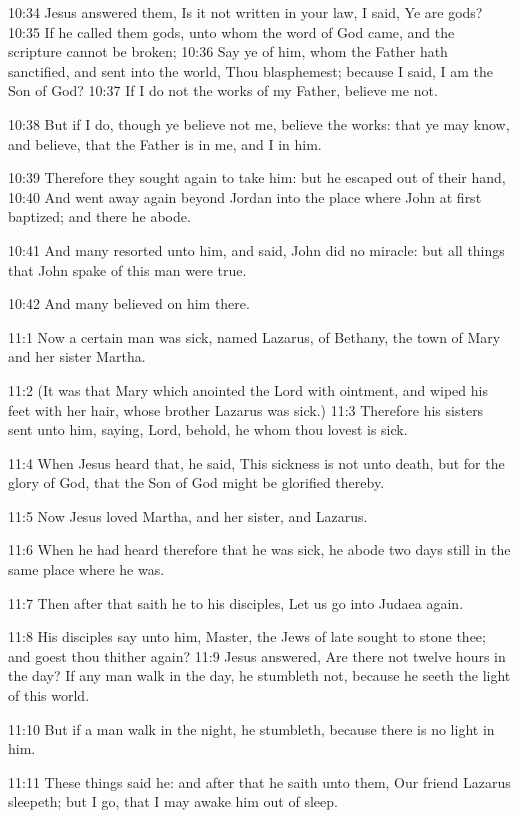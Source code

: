 10:34 Jesus answered them, Is it not written in your law, I said, Ye are gods?  10:35 If he called them gods, unto whom the word of God came, and the scripture cannot be broken; 10:36 Say ye of him, whom the Father hath sanctified, and sent into the world, Thou blasphemest; because I said, I am the Son of God?  10:37 If I do not the works of my Father, believe me not.

10:38 But if I do, though ye believe not me, believe the works: that ye may know, and believe, that the Father is in me, and I in him.

10:39 Therefore they sought again to take him: but he escaped out of their hand, 10:40 And went away again beyond Jordan into the place where John at first baptized; and there he abode.

10:41 And many resorted unto him, and said, John did no miracle: but all things that John spake of this man were true.

10:42 And many believed on him there.

11:1 Now a certain man was sick, named Lazarus, of Bethany, the town of Mary and her sister Martha.

11:2 (It was that Mary which anointed the Lord with ointment, and wiped his feet with her hair, whose brother Lazarus was sick.)  11:3 Therefore his sisters sent unto him, saying, Lord, behold, he whom thou lovest is sick.

11:4 When Jesus heard that, he said, This sickness is not unto death, but for the glory of God, that the Son of God might be glorified thereby.

11:5 Now Jesus loved Martha, and her sister, and Lazarus.

11:6 When he had heard therefore that he was sick, he abode two days still in the same place where he was.

11:7 Then after that saith he to his disciples, Let us go into Judaea again.

11:8 His disciples say unto him, Master, the Jews of late sought to stone thee; and goest thou thither again?  11:9 Jesus answered, Are there not twelve hours in the day? If any man walk in the day, he stumbleth not, because he seeth the light of this world.

11:10 But if a man walk in the night, he stumbleth, because there is no light in him.

11:11 These things said he: and after that he saith unto them, Our friend Lazarus sleepeth; but I go, that I may awake him out of sleep.

